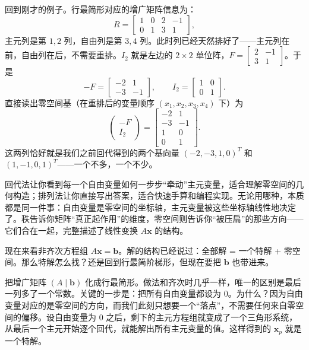 \documentclass[UTF8]{ctexbook}
\begin{document}
回到刚才的例子。行最简形对应的增广矩阵信息为：
\[
R=\left[\begin{array}{cc|cc}
1&0&2&-1\\
0&1&3&1
\end{array}\right],
\]
主元列是第 $1,2$ 列，自由列是第 $3,4$ 列。此时列已经天然排好了——主元列在前，自由列在后，不需要重排。$I_2$ 就是左边的 $2\times2$ 单位阵，$F=\begin{bmatrix}2&-1\\3&1\end{bmatrix}$。于是
\[
-F=\begin{bmatrix}-2&1\\-3&-1\end{bmatrix},\qquad I_2=\begin{bmatrix}1&0\\0&1\end{bmatrix}.
\]
直接读出零空间基（在重排后的变量顺序 $(x_1,x_2,x_3,x_4)$ 下）为
\[
\begin{pmatrix}-F\\ I_2\end{pmatrix}=
\begin{bmatrix}
-2 & 1\\
-3 & -1\\
1 & 0\\
0 & 1
\end{bmatrix}.
\]
这两列恰好就是我们之前回代得到的两个基向量 $(-2,-3,1,0)^T$ 和 $(1,-1,0,1)^T$——一个不多，一个不少。


回代法让你看到每一个自由变量如何一步步“牵动”主元变量，适合理解零空间的几何构造；排列法让你直接写出答案，适合快速手算和编程实现。无论用哪种，本质都是同一件事：自由变量是零空间的坐标轴，主元变量被这些坐标轴线性地决定了。秩告诉你矩阵“真正起作用”的维度，零空间则告诉你“被压扁”的那些方向——它们合在一起，完整描述了线性变换 $A\mathbf{x}$ 的结构。

现在来看非齐次方程组 $A\mathbf{x}=\mathbf{b}$。解的结构已经说过：全部解 = 一个特解 + 零空间。那么特解怎么找？还是回到行最简阶梯形，但现在要把 $\mathbf{b}$ 也带进来。

把增广矩阵 $(A\mid\mathbf{b})$ 化成行最简形。做法和齐次时几乎一样，唯一的区别是最后一列多了一个常数。关键的一步是：把所有自由变量都设为 $0$。为什么？因为自由变量对应的是零空间的方向，而我们此刻只想要一个“落点”，不需要任何来自零空间的偏移。设自由变量为 $0$ 之后，剩下的主元方程组就变成了一个三角形系统，从最后一个主元开始逐个回代，就能解出所有主元变量的值。这样得到的 $\mathbf{x}_p$ 就是一个特解。
\end{document}
